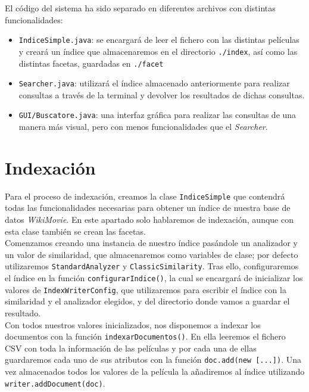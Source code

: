 El código del sistema ha sido separado en diferentes archivos con distintas funcionalidades:

\begin{itemize}
\item \texttt{IndiceSimple.java}: se encargará de leer el fichero con las distintas películas y creará un índice que almacenaremos en el directorio \texttt{./index}, así como las distintas facetas, guardadas en \texttt{./facet}
\item \texttt{Searcher.java}: utilizará el índice almacenado anteriormente para realizar consultas a través de la terminal y devolver los resultados de dichas consultas.
\item \texttt{GUI/Buscatore.java}: una interfaz gráfica para realizar las consultas de una manera más visual, pero con menos funcionalidades que el \textit{Searcher}.
\end{itemize}

\section{Indexación}
Para el proceso de indexación, creamos la clase \texttt{IndiceSimple} que contendrá todas las funcionalidades necesarias para obtener un índice de nuestra base de datos \textit{WikiMovie}. En este apartado solo hablaremos de indexación, aunque con esta clase también se crean las facetas.\\

Comenzamos creando una instancia de nuestro índice pasándole un analizador y un valor de similaridad, que almacenaremos como variables de clase; por defecto utilizaremos \texttt{StandardAnalyzer} y \texttt{ClassicSimilarity}. Tras ello, configuraremos el índice en la función \texttt{configurarIndice()}, la cual se encargará de inicializar los valores de \texttt{IndexWriterConfig}, que utilizaremos para escribir el índice con la similaridad y el analizador elegidos, y del directorio donde vamos a guardar el resultado.\\

Con todos nuestros valores inicializados, nos disponemos a indexar los documentos con la función \texttt{indexarDocumentos()}. En ella leeremos el fichero CSV con toda la información de las películas y por cada una de ellas guardaremos cada uno de sus atributos con la función \texttt{doc.add(new [...])}. Una vez almacenados todos los valores de la película la añadiremos al índice utilizando \texttt{writer.addDocument(doc)}.\\


